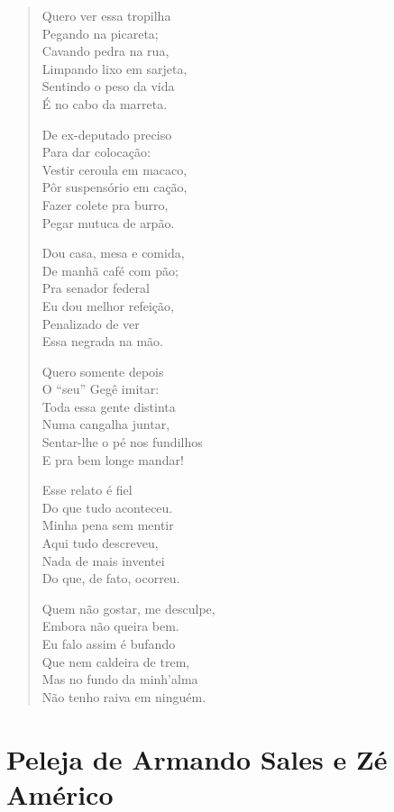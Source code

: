\begin{verse}
Quero ver essa tropilha\\
Pegando na picareta;\\
Cavando pedra na rua,\\
Limpando lixo em sarjeta,\\
Sentindo o peso da vida\\
É no cabo da marreta.

De ex-deputado preciso\\
Para dar colocação:\\
Vestir ceroula em macaco,\\
Pôr suspensório em cação,\\
Fazer colete pra burro,\\
Pegar mutuca de arpão.

Dou casa, mesa e comida,\\
De manhã café com pão;\\
Pra senador federal\\
Eu dou melhor refeição, \\
Penalizado de ver\\
Essa negrada na mão.
\pagebreak

Quero somente depois\\
O “seu” Gegê imitar:\\
Toda essa gente distinta\\
Numa cangalha juntar,\\
Sentar-lhe o pé nos fundilhos\\
E pra bem longe mandar!

Esse relato é fiel\\
Do que tudo aconteceu.\\
Minha pena sem mentir\\
Aqui tudo descreveu,\\
Nada de mais inventei\\
Do que, de fato, ocorreu.

Quem não gostar, me desculpe,\\
Embora não queira bem.\\
Eu falo assim é bufando\\
Que nem caldeira de trem,\\
Mas no fundo da minh’alma\\
Não tenho raiva em ninguém.
\end{verse}

\chapter{Peleja de Armando Sales e Zé Américo}

